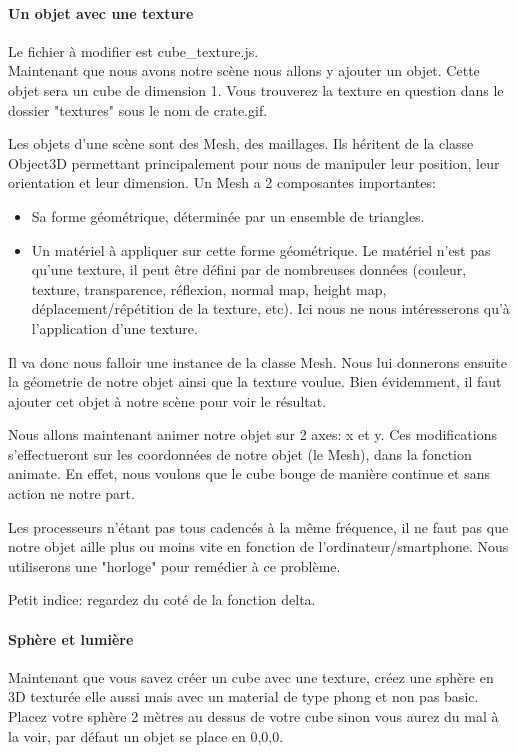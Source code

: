 \documentclass[a4paper,10pt]{article}
\begin{document}
\paragraph{Un objet avec une texture}
Le fichier à modifier est cube_texture.js. \\
Maintenant que nous avons notre scène nous allons y ajouter un objet.
Cette objet sera un cube de dimension 1.
Vous trouverez la texture en question dans le dossier "textures" sous le nom de crate.gif.

Les objets d'une scène sont des Mesh, des maillages. Ils héritent de la classe Object3D permettant principalement pour nous de manipuler leur position, leur orientation et leur dimension.
Un Mesh a 2 composantes importantes:
\begin{itemize}
\item Sa forme géométrique, déterminée par un ensemble de triangles.
\item Un matériel à appliquer sur cette forme géométrique. Le matériel n'est pas qu'une texture, il peut être défini par de nombreuses données (couleur, texture, transparence, réflexion, normal map, height map, déplacement/répétition de la texture, etc). Ici nous ne nous intéresserons qu'à l'application d'une texture.
\end{itemize}

Il va donc nous falloir une instance de la classe Mesh.
Nous lui donnerons ensuite la géometrie de notre objet ainsi que la texture voulue.
Bien évidemment, il faut ajouter cet objet à notre scène pour voir le résultat.

Nous allons maintenant animer notre objet sur 2 axes: x et y.
Ces modifications s'effectueront sur les coordonnées de notre objet (le Mesh), dans la fonction animate.
En effet, nous voulons que le cube bouge de manière continue et sans action ne notre part.

Les processeurs n'étant pas tous cadencés à la même fréquence, il ne faut pas que notre objet aille plus ou moins vite en fonction de l'ordinateur/smartphone.
Nous utiliserons une "horloge" pour remédier à ce problème.

Petit indice: regardez du coté de la fonction delta.

\paragraph{Sphère et lumière}
Maintenant que vous savez créer un cube avec une texture, créez une sphère en 3D texturée elle aussi mais avec un material de type phong et non pas basic.
Placez votre sphère 2 mètres au dessus de votre cube sinon vous aurez du mal à la voir, par défaut un objet se place en 0,0,0.
\end{document}

